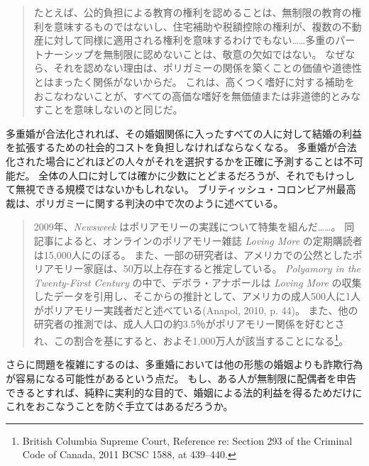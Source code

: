 \documentclass[paper=a4,book,openany]{jlreq}
\begin{document}
\begin{quote}
たとえば、公的負担による教育の権利を認めることは、無制限の教育の権利を意味するものではないし、住宅補助や税額控除の権利が、複数の不動産に対して同様に適用される権利を意味するわけでもない……多重のパートナーシップを無制限に認めないことは、敬意の欠如ではない。
なぜなら、それを認めない理由は、ポリガミーの関係を築くことの価値や道徳性とはまったく関係がないからだ。
これは、高くつく嗜好に対する補助をおこなわないことが、すべての高価な嗜好を無価値または非道徳的とみなすことを意味しないのと同じだ。
\citep[p.249]{march11:_is_there_right_polyg}
\end{quote}

多重婚が合法化されれば、その婚姻関係に入ったすべての人に対して結婚の利益を拡張するための社会的コストを負担しなければならなくなる。
多重婚が合法化された場合にどれほどの人々がそれを選択するかを正確に予測することは不可能だ。
全体の人口に対しては確かに少数にとどまるだろうが、それでもけっして無視できる規模ではないかもしれない。
ブリティッシュ・コロンビア州最高裁は、ポリガミーに関する判決の中で次のように述べている。

\begin{quote}
2009年、\emph{Newsweek} はポリアモリーの実践について特集を組んだ……。
同記事によると、オンラインのポリアモリー雑誌 \emph{Loving More} の定期購読者は15,000人にのぼる。
また、一部の研究者は、アメリカでの公然としたポリアモリー家庭は、50万以上存在すると推定している。
\emph{Polyamory in the Twenty-First Century} の中で、デボラ・アナポールは \emph{Loving More} の収集したデータを引用し、そこからの推計として、アメリカの成人500人に1人がポリアモリー実践者だと述べている(Anapol, 2010, p. 44)。
また、他の研究者の推測では、成人人口の約3.5％がポリアモリー関係を好むとされ、この割合を基にすると、およそ1,000万人が該当することになる\footnote{British Columbia Supreme Court, Reference re: Section 293 of the Criminal Code of Canada, 2011 BCSC 1588, at 439--440.}。
\nocite{anapol10:_polyam_centur}
\end{quote}

さらに問題を複雑にするのは、多重婚においては他の形態の婚姻よりも詐欺行為が容易になる可能性があるという点だ。
もし、ある人が無制限に配偶者を申告できるとすれば、純粋に実利的な目的で、婚姻による法的利益を得るためだけにこれをおこなうことを防ぐ手立てはあるだろうか。
\end{document}
